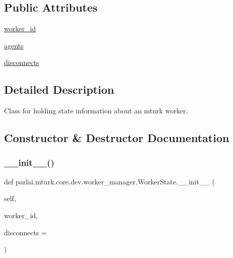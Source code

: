 \subsection*{Public Attributes}
\begin{DoxyCompactItemize}
\item 
\hyperlink{classparlai_1_1mturk_1_1core_1_1dev_1_1worker__manager_1_1WorkerState_aa4019a351d1a1e41bc7a8c26229b2772}{worker\+\_\+id}
\item 
\hyperlink{classparlai_1_1mturk_1_1core_1_1dev_1_1worker__manager_1_1WorkerState_ae267b0c320d73f92f96dd347bb9265cb}{agents}
\item 
\hyperlink{classparlai_1_1mturk_1_1core_1_1dev_1_1worker__manager_1_1WorkerState_aaf0e1e68c219df754da29d8188150796}{disconnects}
\end{DoxyCompactItemize}


\subsection{Detailed Description}
\begin{DoxyVerb}Class for holding state information about an mturk worker.
\end{DoxyVerb}
 

\subsection{Constructor \& Destructor Documentation}
\mbox{\label{classparlai_1_1mturk_1_1core_1_1dev_1_1worker__manager_1_1WorkerState_ad5b7c2eef6d44cb5856beb7f951bc76a}} 
\subsubsection{\texorpdfstring{\+\_\+\+\_\+init\+\_\+\+\_\+()}{\_\_init\_\_()}}
{\footnotesize\ttfamily def parlai.\+mturk.\+core.\+dev.\+worker\+\_\+manager.\+Worker\+State.\+\_\+\+\_\+init\+\_\+\+\_\+ (\begin{DoxyParamCaption}\item[{}]{self,  }\item[{}]{worker\+\_\+id,  }\item[{}]{disconnects = {} }\end{DoxyParamCaption})}

